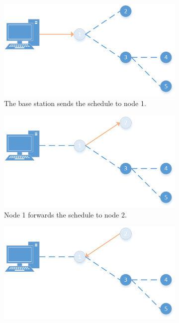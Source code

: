 \begin{figure}[htbp]
	\centering
	\begin{subfigure}[t]{0.4\textwidth}
		\centering
    		\includegraphics[scale=0.6]{content/images/ScheduleSpreading/Part1}
   	 	\caption{The base station sends the schedule to node 1.}
    	\label{fig:spreading1}
    \end{subfigure}
    \quad
    \quad
    \begin{subfigure}[t]{0.4\textwidth}
		\centering         
        \includegraphics[scale=0.6]{content/images/ScheduleSpreading/Part2}
        \caption{Node 1 forwards the schedule to node 2.}
        \label{fig:spreading2}
    \end{subfigure}
    \quad
    \quad
    \begin{subfigure}[t]{0.4\textwidth}
		\centering         
        \includegraphics[scale=0.6]{content/images/ScheduleSpreading/Part3}

\end{subfigure}
\end{figure}

